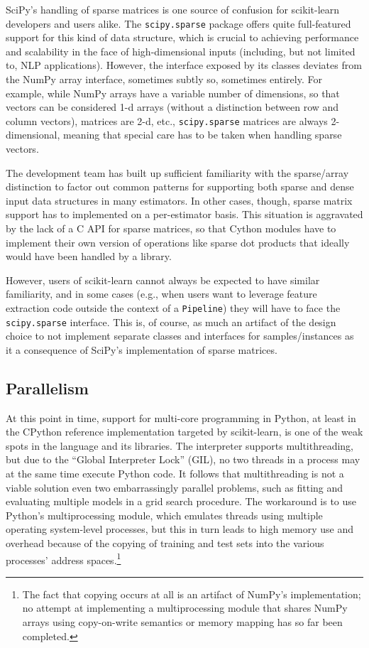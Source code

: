 \documentclass[a4paper,twocolumn]{article}
\begin{document}
SciPy's handling of sparse matrices is one source of confusion
for scikit-learn developers and users alike.
The \texttt{scipy.sparse} package offers quite full-featured support
for this kind of data structure,
which is crucial to achieving performance and scalability
in the face of high-dimensional inputs
(including, but not limited to, NLP applications).
However, the interface exposed by its classes
deviates from the NumPy array interface, sometimes subtly so,
sometimes entirely.  %
For example, while NumPy arrays have a variable number of dimensions,
so that vectors can be considered 1-d arrays
(without a distinction between row and column vectors),
matrices are 2-d, etc., \texttt{scipy.sparse} matrices are always 2-dimensional,
meaning that special care has to be taken when handling sparse vectors.

The development team has built up sufficient familiarity
with the sparse/array distinction to factor out common patterns
for supporting both sparse and dense input data structures in many estimators.
In other cases, though, sparse matrix support has to implemented
on a per-estimator basis.
This situation is aggravated by the lack of a C API for sparse matrices,
so that Cython modules have to implement their own version
of operations like sparse dot products
that ideally would have been handled by a library.

However, users of scikit-learn cannot always be expected
to have similar familiarity, and in some cases
(e.g., when users want to leverage feature extraction code
outside the context of a \texttt{Pipeline})
they will have to face the \texttt{scipy.sparse} interface.
This is, of course, as much an artifact of the design choice
to not implement separate classes and interfaces for samples/instances
as it a consequence of SciPy's implementation of sparse matrices.

\subsection{Parallelism}

At this point in time, support for multi-core programming in Python,
at least in the CPython reference implementation targeted by scikit-learn,
is one of the weak spots in the language and its libraries.
The interpreter supports multithreading,
but due to the ``Global Interpreter Lock'' (GIL),
no two threads in a process may at the same time execute Python code.
It follows that multithreading is not a viable solution
even two embarrassingly parallel problems,
such as fitting and evaluating multiple models in a grid search procedure.
The workaround is to use Python's multiprocessing module,
which emulates threads using multiple operating system-level processes,
but this in turn leads to high memory use and overhead
because of the copying of training and test sets
into the various processes' address spaces.\footnote{
  The fact that copying occurs at all is an artifact of NumPy's implementation;
  no attempt at implementing a multiprocessing module
  that shares NumPy arrays using copy-on-write semantics or memory mapping
  has so far been completed.}
\end{document}
